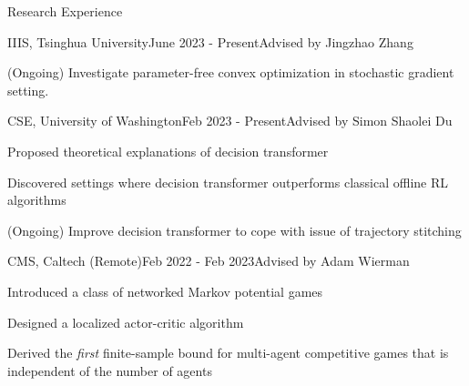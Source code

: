 \documentclass[]{cv}
\begin{document}
\begin{section}{Research Experience}
    \begin{subsection3}{IIIS, Tsinghua University}{June 2023 - Present}{Advised by Jingzhao Zhang}
        \item (Ongoing) Investigate parameter-free convex optimization in stochastic gradient setting.
    \end{subsection3}

    \begin{subsection3}{CSE, University of Washington}{Feb 2023 - Present}{Advised by Simon Shaolei Du}
        \item Proposed theoretical explanations of decision transformer
        \item Discovered settings where decision transformer outperforms classical offline RL algorithms
        \item (Ongoing) Improve decision transformer to cope with issue of trajectory stitching
    \end{subsection3}

    \begin{subsection3}{CMS, Caltech (Remote)}{Feb 2022 - Feb 2023}{Advised by Adam Wierman}
        \item Introduced a class of networked Markov potential games
        \item Designed a localized actor-critic algorithm
        \item Derived the \emph{first} finite-sample bound for multi-agent competitive games 
        that is independent of the number of agents
    \end{subsection3}
    

    
    
\end{section}

\end{document}

